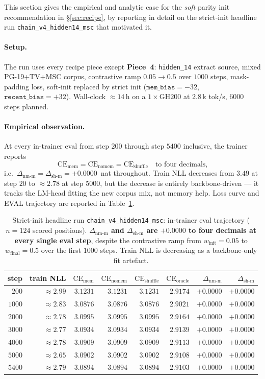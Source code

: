 \documentclass{article}
\newcommand{\dnm}{\Delta_{\text{nm-m}}}
\newcommand{\dsh}{\Delta_{\text{sh-m}}}
\newcommand{\CEmem}{\mathrm{CE}_{\text{mem}}}
\newcommand{\CEnomem}{\mathrm{CE}_{\text{nomem}}}
\newcommand{\CEsh}{\mathrm{CE}_{\text{shuffle}}}
\newcommand{\CEor}{\mathrm{CE}_{\text{oracle}}}
\begin{document}
This section gives the empirical and analytic case for the
\emph{soft} parity init recommendation in \S\ref{sec:recipe}, by
reporting in detail on the strict-init headline run
\texttt{chain\_v4\_hidden14\_msc} that motivated it.

\paragraph{Setup.} The run uses every recipe piece except
\textbf{Piece~4}: \texttt{hidden\_14} extract source, mixed
PG-19+TV+MSC corpus, contrastive ramp $0.05 \to 0.5$ over $1000$
steps, mask-padding loss, soft-init replaced by strict init
($\texttt{mem\_bias}{=}{-32}$, $\texttt{recent\_bias}{=}{+32}$).
Wall-clock $\approx$$14$\,h on a $1\!\times\!\mathrm{GH200}$ at
$2.8$\,k tok/s, $6000$ steps planned.

\paragraph{Empirical observation.} At every in-trainer eval from
step $200$ through step $5400$ inclusive, the trainer reports
\[
\CEmem = \CEnomem = \CEsh \quad\text{to four decimals,}
\]
i.e.\ $\dnm = \dsh = +0.0000$~nat throughout. Train NLL decreases
from $3.49$ at step $20$ to $\approx 2.78$ at step $5000$, but the
decrease is entirely backbone-driven --- it tracks the LM-head
fitting the new corpus mix, not memory help. Loss curve and EVAL
trajectory are reported in Table~\ref{tab:strict_eval}.

\begin{table}[t]
\centering
\caption{Strict-init headline run \texttt{chain\_v4\_hidden14\_msc}:
in-trainer eval trajectory ($n{=}124$ scored positions).
\textbf{$\dnm$ and $\dsh$ are $+0.0000$ to four decimals at every
single eval step}, despite the contrastive ramp from
$w_{\text{init}}{=}0.05$ to $w_{\text{final}}{=}0.5$ over the first
$1000$ steps. Train NLL is decreasing as a backbone-only fit
artefact.}
\label{tab:strict_eval}
\small
\begin{tabular}{rrrrrrrr}
\toprule
step & train NLL & $\CEmem$ & $\CEnomem$ & $\CEsh$ & $\CEor$ & $\dnm$ & $\dsh$ \\
\midrule
$200$  & $\approx 2.99$ & $3.1231$ & $3.1231$ & $3.1231$ & $2.9174$ & $+0.0000$ & $+0.0000$ \\
$1000$ & $\approx 2.83$ & $3.0876$ & $3.0876$ & $3.0876$ & $2.9021$ & $+0.0000$ & $+0.0000$ \\
$2000$ & $\approx 2.78$ & $3.0995$ & $3.0995$ & $3.0995$ & $2.9164$ & $+0.0000$ & $+0.0000$ \\
$3000$ & $\approx 2.77$ & $3.0934$ & $3.0934$ & $3.0934$ & $2.9139$ & $+0.0000$ & $+0.0000$ \\
$4000$ & $\approx 2.78$ & $3.0909$ & $3.0909$ & $3.0909$ & $2.9113$ & $+0.0000$ & $+0.0000$ \\
$5000$ & $\approx 2.65$ & $3.0902$ & $3.0902$ & $3.0902$ & $2.9108$ & $+0.0000$ & $+0.0000$ \\
$5400$ & $\approx 2.79$ & $3.0894$ & $3.0894$ & $3.0894$ & $2.9103$ & $+0.0000$ & $+0.0000$ \\
\bottomrule
\end{tabular}
\end{table}
\end{document}
